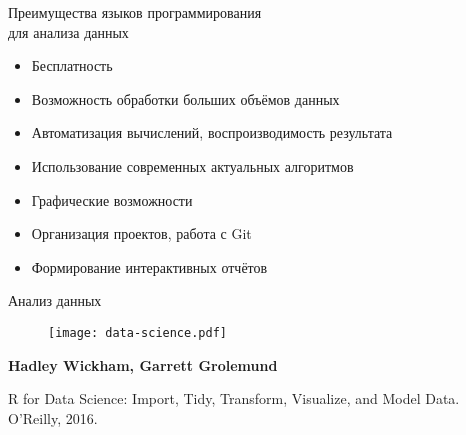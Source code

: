 \documentclass[xcolor=dvipsnames, 12pt]{beamer}
\begin{document}
\begin{frame}{Преимущества языков программирования \\для анализа данных}

\begin{itemize}
\item \alert{Бесплатность}

\vskip0.2cm

\item Возможность обработки больших объёмов данных

\vskip0.2cm

\item Автоматизация вычислений, воспроизводимость результата

\vskip0.2cm

\item Использование современных актуальных алгоритмов

\vskip0.2cm

\item Графические возможности

\vskip0.2cm

\item Организация проектов, работа с Git

\vskip0.2cm

\item Формирование интерактивных отчётов

\end{itemize}


\end{frame}  
  
\begin{frame}{Анализ данных}

\vspace*{-1.2cm}
\begin{figure}[h!]
\hspace*{-1.2cm}
 \centering
 \texttt{[image: data-science.pdf]}
\end{figure}

\vspace*{-1.2cm}
\begin{thebibliography}{99}
{\scriptsize
\textbf{Hadley Wickham, Garrett Grolemund}

R for Data Science: Import, Tidy, Transform, Visualize, and Model Data. \\ O'Reilly, 2016. 

}
\end{thebibliography}

\end{frame}  
\end{document}
